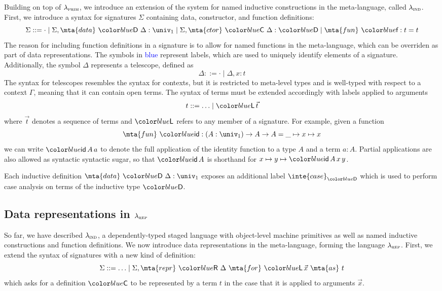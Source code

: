 Building on top of $\lambda_{\textsc{prim}}$, we introduce an extension of the system for
named inductive constructions in the meta-language, called $\lambda_{\textsc{ind}}$. First,
we introduce a syntax for signatures $\Sigma$ containing data, constructor, and
function definitions:
\[
  \Sigma ::= \cdot \mid \Sigma, \mta{data} \ \lab{D} \ \Delta : \univ_1 \mid \Sigma, \mta{ctor} \ \lab{C} \ \Delta : \lab{D} \mid \mta{fun} \ \lab{f} : t = t
\]
The reason for including function definitions in a signature is to allow for
named functions in the meta-language, which can be overriden as part of data
representations. The symbols in \textcolor{blue}{blue} represent labels, which
are used to uniquely identify elements of a signature. Additionally, the symbol
$\Delta$ represents a telescope, defined as
\[
  \Delta ::= \cdot \mid \Delta, x : t
\]
The syntax for telescopes resembles the syntax for contexts, but it is
restricted to meta-level types and is well-typed with respect to a context
$\Gamma$, meaning that it can contain open terms. The syntax of terms must be
extended accordingly with labels applied to arguments
\[
  t ::= \ldots \mid \lab{L} \, \vec{t}
\]
where $\vec{t}$ denotes a sequence of terms and $\lab L$ refers to any member
of a signature. For example, given a function
\[
  \mta{fun} \ \lab{id} : (A : \univ_1) \to A \to A = \_ \mapsto x \mapsto x
\]
we can write $\lab{id} \, A \, a$ to denote the full application of the
identity function to a type $A$ and a term $a : A$. Partial applications are
also allowed as syntactic syntactic sugar, so that $\lab{id} \, A$ is shorthand
for $x \mapsto y \mapsto \lab{id} \, A \, x \, y$.

Each inductive definition $\mta{data} \ \lab{D} \ \Delta : \univ_1$ exposes an
additional label $\inte{case}_{\lab{D}}$ which is used to perform case analysis
on terms of the inductive type $\lab{D}$.

\subsection{Data representations in $\lambda_{\textsc{rep}}$}

So far, we have described $\lambda_{\textsc{ind}}$, a dependently-typed staged language
with object-level machine primitives as well as named inductive constructions
and function definitions. We now introduce data representations in the
meta-language, forming the language $\lambda_{\textsc{rep}}$. First, we extend the syntax
of signatures with a new kind of definition:
\[
  \Sigma ::= \ldots \mid \Sigma, \mta{repr} \ \lab{R} \ \Delta \ \mta{for} \ \lab{L}\,\vec{x}\ \mta{as}\ t
\]
which asks for a definition $\lab{C}$ to be represented by a term $t$ in the
case that it is applied to arguments $\vec{x}$.


